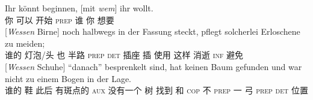 \eal
\ex 
\gll Ihr könnt beginnen, [mit  \emph{wem}] ihr wollt.\footnotemark\\
     你 可以    开始    \hspaceThis{[}\textsc{prep} 谁 你 想要\\
\ex 
\gll {}[\emph{Wessen}      Birne]    noch halbwegs in der Fassung steckt, pflegt solcherlei Erloschene zu meiden;\footnotemark\\
       \hspaceThis{[}谁的 灯泡/头 也  半路  \textsc{prep} \textsc{det} 插座  插      使用  这样      消逝    \textsc{inf} 避免\\
\ex 
\gll {}[\emph{Wessen}     Schuhe] "`danach"'  besprenkelt sind, hat keinen Baum gefunden und war nicht zu einem Bogen in der Lage.\footnotemark\\
       \hspaceThis{[}谁的  鞋      此后 有斑点的    \passiveprs{}   \textsc{aux} 没有一个   树 找到    和 \textsc{cop} 不   \textsc{prep} 一     弓   \textsc{prep} \textsc{det} 位置\\
\zl
%
